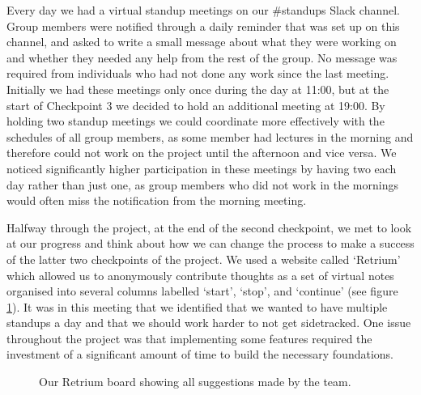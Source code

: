 Every day we had a virtual standup meetings on our \#standups Slack channel. Group members were notified through a daily reminder that was set up on this channel, and asked to write a small message about what they were working on and whether they needed any help from the rest of the group. No message was required from individuals who had not done any work since the last meeting. Initially we had these meetings only once during the day at 11:00, but at the start of Checkpoint 3 we decided to hold an additional meeting at 19:00. By holding two standup meetings we could coordinate more effectively with the schedules of all group members, as some member had lectures in the morning and therefore could not work on the project until the afternoon and vice versa. We noticed significantly higher participation in these meetings by having two each day rather than just one, as group members who did not work in the mornings would often miss the notification from the morning meeting.

Halfway through the project, at the end of the second checkpoint, we met to look at our progress and think about how we can change the process to make a success of the latter two checkpoints of the project. We used a website called `Retrium' which allowed us to anonymously contribute thoughts as a set of virtual notes organised into several columns labelled `start', `stop', and `continue' (see figure \ref{retrium}). It was in this meeting that we identified that we wanted to have multiple standups a day and that we should work harder to not get sidetracked. One issue throughout the project was that implementing some features required the investment of a significant amount of time to build the necessary foundations.

\begin{figure}[htpb]
\centering
{}
\caption{Our Retrium board showing all suggestions made by the team.}
\label{retrium}
\end{figure}

